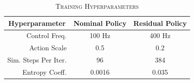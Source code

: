 \begin{table}[ht]
\caption{\textsc{Training Hyperparameters}} \label{tab:hyperparams}
\centering
\begin{tabular}{rcc}
\hline
\multicolumn{1}{c}{Hyperparameter} & Nominal Policy & Residual Policy \\ \hline
Control Freq.                      & 100 Hz      & 400 Hz          \\
Action Scale                       & 0.5         & 0.2             \\
Sim. Steps Per Iter.                     & 96          & 384             \\
Entropy Coeff.                     & 0.0016      & 0.035           \\ \hline
\end{tabular}
\end{table}